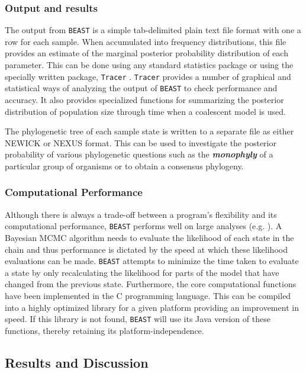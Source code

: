 \documentclass[cup7b, english]{cupbook}
\begin{document}
\subsubsection{Output and results}

The output from \texttt{BEAST} is a simple tab-delimited plain text file format
with one a row for each sample. When accumulated into frequency distributions,
this file provides an estimate of the marginal posterior probability
distribution of each parameter. This can be done using any standard
statistics package or using the specially written package, \texttt{Tracer}
\cite{RD2003}. \texttt{Tracer} provides a number of graphical and statistical
ways of analyzing the output of \texttt{BEAST} to check performance and accuracy.
It also provides specialized functions for summarizing the posterior distribution of
population size through time when a coalescent model is used.

The phylogenetic tree of each sample state is written to a separate
file as either NEWICK or NEXUS format. This can be used to investigate
the posterior probability of various phylogenetic questions such as
the \textbf{\textit{monophyly}} of a particular group of organisms or to obtain a consensus
phylogeny.

\subsubsection{Computational Performance}

Although there is always a trade-off between a program's flexibility
and its computational performance, \texttt{BEAST} performs well on large analyses
(e.g. \cite{Shapiroetal2004}). A Bayesian MCMC algorithm needs to
evaluate the likelihood of each state in the chain and thus performance
is dictated by the speed at which these likelihood evaluations can
be made. \texttt{BEAST} attempts to minimize the time taken to evaluate a state
by only recalculating the likelihood for parts of the model that have
changed from the previous state. Furthermore, the core computational
functions have been implemented in the C programming language. This
can be compiled into a highly optimized library for a given platform
providing an improvement in speed. If this library is not found, \texttt{BEAST}
will use its Java version of these functions, thereby retaining its
platform-independence.

\subsection{Results and Discussion}
\end{document}
